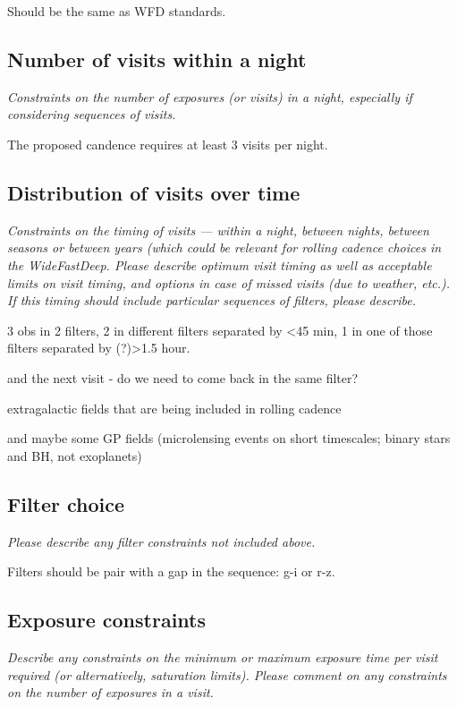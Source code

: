 \documentclass[11pt]{article}
\begin{document}
Should be the same as WFD standards.

\subsection{Number of visits within a night}
\begin{footnotesize}{\it Constraints on the number of exposures (or visits) in a night, especially if considering sequences of visits.  }
\end{footnotesize}

The proposed candence requires at least 3 visits per night.

\subsection{Distribution of visits over time}
\begin{footnotesize}{\it Constraints on the timing of visits --- within a night, between nights, between seasons or between years (which could be relevant for rolling cadence choices in the WideFastDeep. Please describe optimum visit timing as well as acceptable limits on visit timing, and options in case of missed visits (due to weather, etc.). If this timing should include particular sequences of filters, please describe.}
\end{footnotesize}

3 obs in 2 filters, 2 in different filters separated by <45 min, 1 in one of those filters separated by (?)>1.5 hour.

and the next visit - do we need to come back in the same filter? 

extragalactic fields that are being included in rolling cadence

and maybe some GP fields (microlensing events on short timescales; binary stars and BH, not exoplanets)

\subsection{Filter choice}
\begin{footnotesize}
{\it Please describe any filter constraints not included above.}
\end{footnotesize}

Filters should be pair with a gap in the sequence: g-i or r-z.                                                       
\subsection{Exposure constraints}
\begin{footnotesize}
{\it Describe any constraints on the minimum or maximum exposure time per visit required (or alternatively, saturation limits). Please comment on any constraints on the number of exposures in a visit.}
\end{footnotesize}
\end{document}

